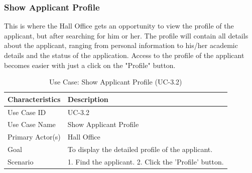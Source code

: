 \subsubsection{Show Applicant Profile}
This is where the Hall Office gets an opportunity to view the profile of the applicant, but after searching for him or her. The profile will contain all details about the applicant, ranging from personal information to his/her academic details and the status of the application. Access to the profile of the applicant becomes easier with just a click on the "Profile" button.
\begin{table}[H]
    \centering
    \small
    \renewcommand{\arraystretch}{1.4}
    \caption{Use Case: Show Applicant Profile (UC-3.2)}
    \label{tab:hall_show_profile}
    
    \begin{tabularx}{\textwidth}{|l|X|}
        \hline
        \rowcolor[gray]{0.9} {Characteristics} & {Description} \\ \hline
        Use Case ID & UC-3.2 \\ \hline
        Use Case Name & Show Applicant Profile \\ \hline
        Primary Actor(s) & Hall Office \\ \hline
        Goal & To display the detailed profile of the applicant. \\ \hline
        Scenario & 1. Find the applicant. 2. Click the 'Profile' button. \\ \hline
    \end{tabularx}
\end{table}
\FloatBarrier